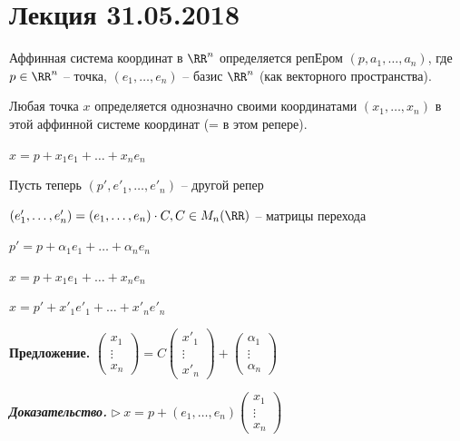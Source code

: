 \section{Лекция 31.05.2018}

Аффинная система координат в $\RR^n$ определяется репЕром $(p, a_1, \dots, a_n)$, где $p \in \RR^n$ -- точка, $(e_1, \dots, e_n)$ -- базис $\RR^n$ (как векторного пространства).

\bigskip
Любая точка $x$ определяется однозначно своими координатами $(x_1, \dots, x_n)$ в этой аффинной системе координат (= в этом репере).

$x = p + x_1 e_1 + \dots + x_n e_n$

\bigskip
Пусть теперь $(p', e'_1, \dots, e'_n)$ -- другой репер

$(e'_1, \dots, e'_n) = (e_1, \dots, e_n) \cdot C, C \in M_n (\RR)$ -- матрицы перехода

$p' = p + \alpha_1 e_1 + \dots + \alpha_n e_n$

$x = p + x_1 e_1 + \dots + x_n e_n$

$x = p' + x'_1 e'_1 + \dots + x'_n e'_n$

\bigskip
\textbf{Предложение.} $\begin{pmatrix} x_1 \\ \vdots \\ x_n \end{pmatrix} = C \begin{pmatrix} x'_1 \\ \vdots \\ x'_n \end{pmatrix} + \begin{pmatrix} \alpha_1 \\ \vdots \\ \alpha_n \end{pmatrix}$

\bigskip
\textbf{\textit{Доказательство.}} $\rhd \ x = p + (e_1, \dots, e_n) \begin{pmatrix} x_1 \\ \vdots \\ x_n \end{pmatrix}$

